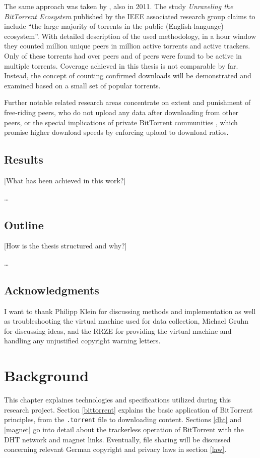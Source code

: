 \documentclass[10pt, a4paper, twoside, headsepline]{scrbook}
\renewcommand{\_}{\origunderscore\allowbreak}
\begin{document}
The same approach was taken by \textcite{zhang2011unraveling}, also in 2011. The study \emph{Unraveling the BitTorrent Ecosystem} published by the IEEE associated research group claims to include ``the large majority of torrents in the public (English-language) ecosystem''. With detailed description of the used methodology, in a  hour window they counted  million unique peers in  million active torrents and  active trackers. Only  of these torrents had over  peers and  of peers were found to be active in multiple torrents. Coverage achieved in this thesis is not comparable by far. Instead, the concept of counting confirmed downloads will be demonstrated and examined based on a small set of popular torrents.

Further notable related research areas concentrate on extent \cite{locher2006free} and punishment \cite{levin2008bittorrent, bhakuni} of free-riding peers, who do not upload any data after downloading from other peers, or the special implications of private BitTorrent communities \cite{meulpolder2010public}, which promise higher download speeds by enforcing upload to download ratios.

\section{Results}
[What has been achieved in this work?]

\dots

\section{Outline}
[How is the thesis structured and why?]

\dots

\section{Acknowledgments}
I want to thank Philipp Klein for discussing methods and implementation as well as troubleshooting the virtual machine used for data collection, Michael Gruhn for discussing ideas, and the RRZE for providing the virtual machine and handling any unjustified copyright warning letters.

\chapter{Background}
This chapter explaines technologies and specifications utilized during this research project. Section \ref{bittorrent} explains the basic application of BitTorrent principles, from the \texttt{.torrent} file to downloading content. Sections \ref{dht} and \ref{magnet} go into detail about the trackerless operation of BitTorrent with the DHT network and magnet links. Eventually, file sharing will be discussed concerning relevant German copyright and privacy laws in section \ref{law}.
\end{document}
